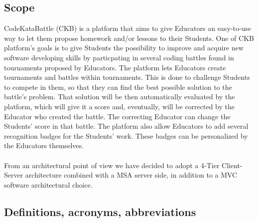 \documentclass{article}
\begin{document}
\subsection{Scope}
CodeKataBattle (CKB) is a platform that aims to give Educators an easy-to-use way to let
them propose homework and/or lessons to their Students.
One of CKB platform's goals is to give Students the possibility to improve and acquire new software
developing skills by particpating in several coding battles found in tournaments proposed by Educators.
The platform lets Educators create tournaments and battles within tournaments.
This is done to challenge Students to compete in them, so that they can find the best possible solution to the battle's
problem. That solution will be then automatically evaluated by the platform, which will give it a score
and, eventually, will be corrected by the Educator who created the battle. The correcting Educator can change the Students' score 
in that battle. The platform also allow Educators to add several recognition badges for the 
Students' work. These badges can be personalized by the Educators themselves.
\\ \\
From an architectural point of view we have decided to adopt a 4-Tier Client-Server architecture combined
with a MSA server side, in addition to a MVC software architectural choice.
\subsection{Definitions, acronyms, abbreviations}
\end{document}
